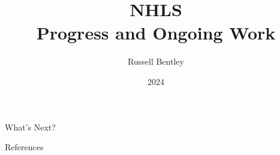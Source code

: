 \documentclass{beamer}
\title{NHLS\\Progress and Ongoing Work}
\author{Russell Bentley}
\institute{Stony Brook}
\date{2024}
\begin{document}
\frame{\titlepage}











\begin{frame}{What's Next?}

\end{frame}

\begin{frame}[allowframebreaks]{References}
    \tiny
    \printbibliography
\end{frame}
\end{document}
